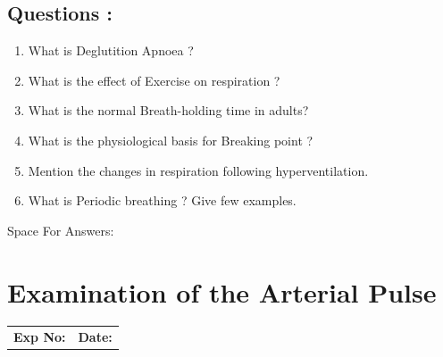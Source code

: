 \documentclass[a4paper,12pt,openany,twoside]{book}
\newcommand{\blankpageForAnswers}{
	\newpage
	\thispagestyle{plain}
	\begin{center}
		\Large Space For Answers: 
	\end{center}
	}
\begin{document}
\section*{Questions :}
\begin{enumerate}
		\itemsep0em
\item{What is Deglutition Apnoea ?}
\item{What is the effect of Exercise on respiration ?}
\item{What is the normal Breath-holding time in adults?}
\item{What is the physiological basis for Breaking point ?}
\item{Mention the changes in respiration following hyperventilation.}
\item{What is Periodic breathing ? Give few examples.}
\end{enumerate}
\blankpageForAnswers

															\chapter*{\centering Examination of the Arterial Pulse}
															\begin{tabular}{p{5in} p{1in}}
																\textbf{Exp No:}  & \textbf{Date:}\\
															\end{tabular}
\end{document}
